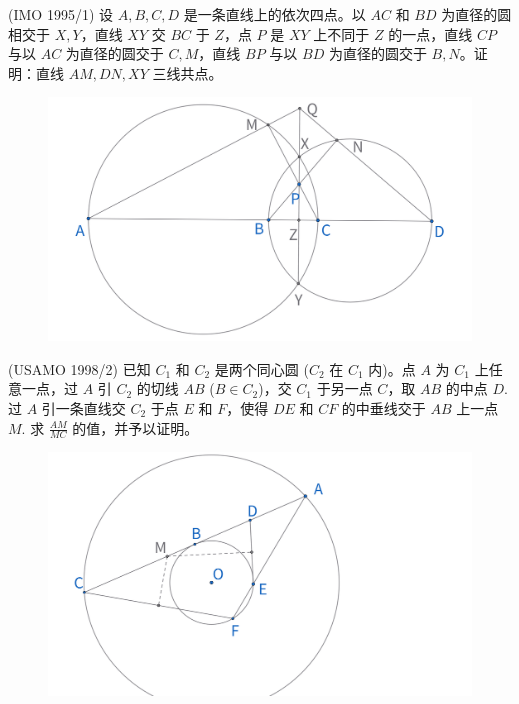 \newpage 
\begin{exercise}
    (IMO 1995/1) 设 $A, B, C, D$ 是一条直线上的依次四点。以 ${AC}$ 和 ${BD}$ 为直径的圆相交于 $X, Y$，直线 $XY$ 交 ${BC}$ 于 $Z$，点 $P$ 是 $XY$ 上不同于 $Z$ 的一点，直线 $CP$ 与以 ${AC}$ 为直径的圆交于 $C, M$，直线 $BP$ 与以 ${BD}$ 为直径的圆交于 $B, N$。证明：直线 $AM, DN, XY$ 三线共点。
\end{exercise}
\begin{figure}[H]
    \centering
    \includegraphics[width=0.7\linewidth]{figures/exercises/231.png}
\end{figure}


\begin{exercise}
    (USAMO 1998/2) 已知 $C_1$ 和 $C_2$ 是两个同心圆 ($C_2$ 在 $C_1$ 内)。点 $A$ 为 $C_1$ 上任意一点，过 $A$ 引 $C_2$ 的切线 $AB$ ($B \in C_2$)，交 $C_1$ 于另一点 $C$，取 $AB$ 的中点 $D.$ 过 $A$ 引一条直线交 $C_2$ 于点 $E$ 和 $F$，使得 $DE$ 和 $CF$ 的中垂线交于 $AB$ 上一点 $M.$ 求 $\frac{AM}{MC}$ 的值，并予以证明。
\end{exercise}
\begin{figure}[H]
    \centering
    \includegraphics[width=0.7\linewidth]{figures/exercises/232.png}
\end{figure}

